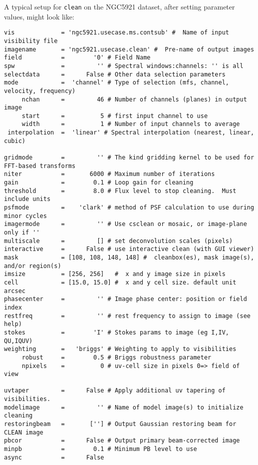 A typical setup for {\tt clean} on the NGC5921 dataset, 
after setting parameter values, might look like:
\small
\begin{verbatim}
vis             = 'ngc5921.usecase.ms.contsub' #  Name of input visibility file
imagename       = 'ngc5921.usecase.clean' #  Pre-name of output images
field           =        '0' # Field Name
spw             =         '' # Spectral windows:channels: '' is all
selectdata      =      False # Other data selection parameters
mode            =  'channel' # Type of selection (mfs, channel, velocity, frequency)
     nchan      =         46 # Number of channels (planes) in output image
     start      =          5 # first input channel to use
     width      =          1 # Number of input channels to average
 interpolation  =  'linear' # Spectral interpolation (nearest, linear, cubic)

gridmode        =         '' # The kind gridding kernel to be used for FFT-based transforms
niter           =       6000 # Maximum number of iterations
gain            =        0.1 # Loop gain for cleaning
threshold       =        8.0 # Flux level to stop cleaning.  Must include units
psfmode         =    'clark' # method of PSF calculation to use during minor cycles
imagermode      =         '' # Use csclean or mosaic, or image-plane only if ''
multiscale      =         [] # set deconvolution scales (pixels)
interactive     =      False # use interactive clean (with GUI viewer)
mask            = [108, 108, 148, 148] #  cleanbox(es), mask image(s), and/or region(s)
imsize          = [256, 256]   #  x and y image size in pixels
cell            = [15.0, 15.0] #  x and y cell size. default unit arcsec
phasecenter     =         '' # Image phase center: position or field index
restfreq        =         '' # rest frequency to assign to image (see help)
stokes          =        'I' # Stokes params to image (eg I,IV, QU,IQUV)
weighting       =   'briggs' # Weighting to apply to visibilities
     robust     =        0.5 # Briggs robustness parameter
     npixels    =          0 # uv-cell size in pixels 0=> field of view

uvtaper         =      False # Apply additional uv tapering of  visibilities.
modelimage      =         '' # Name of model image(s) to initialize cleaning
restoringbeam   =       [''] # Output Gaussian restoring beam for CLEAN image
pbcor           =      False # Output primary beam-corrected image
minpb           =        0.1 # Minimum PB level to use
async           =      False        
\end{verbatim}
\normalsize

